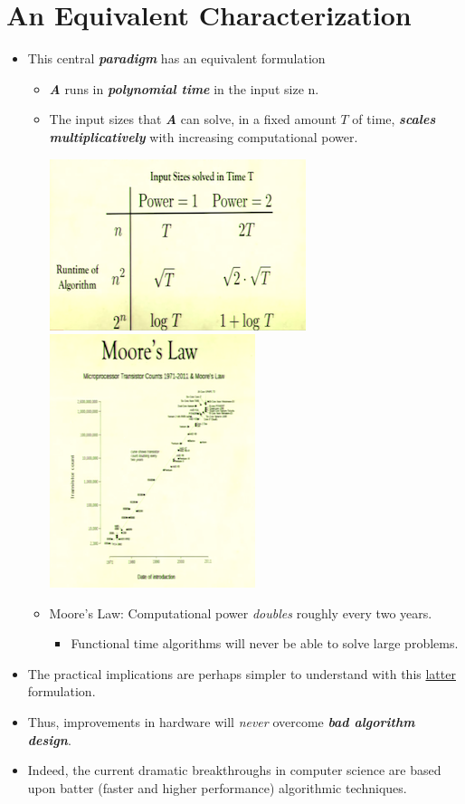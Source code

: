 \documentclass[12pt]{article}
\begin{document}
\section{An Equivalent Characterization}
\renewcommand{\labelitemii}{$\circ$}
\renewcommand{\labelitemiii}{$\cdot$}
\renewcommand{\labelitemiii}{$\rightarrow$}
\begin{itemize}
\item This central \textbf{\textit{paradigm}} has an equivalent formulation
	\begin{itemize}
	\item \textbf{\textit{A}} runs in \textbf{\textit{polynomial time}} in the input size n.
	\item The input sizes that \textbf{\textit{A}} can solve, in a fixed amount $T$ of time, \textbf{\textit{scales multiplicatively}} with increasing computational power.
	\begin{center}
	\includegraphics{lecture1b}
	\bigbreak
	\includegraphics{lecture1c}
	\end{center}
	\item Moore's Law: Computational power \textit{doubles} roughly every two years.
		\begin{itemize}
		\item Functional time algorithms will never be able to solve large problems.
		\end{itemize}
	\end{itemize}

\clearpage	
\item The practical implications are perhaps simpler to understand with this \underline{latter} formulation.
\item Thus, improvements in hardware will \textit{never} overcome \textbf{\textit{bad algorithm design}}.
\item Indeed, the current dramatic breakthroughs in computer science are based upon batter (faster and higher performance) algorithmic techniques.
\end{itemize}
\end{document}
